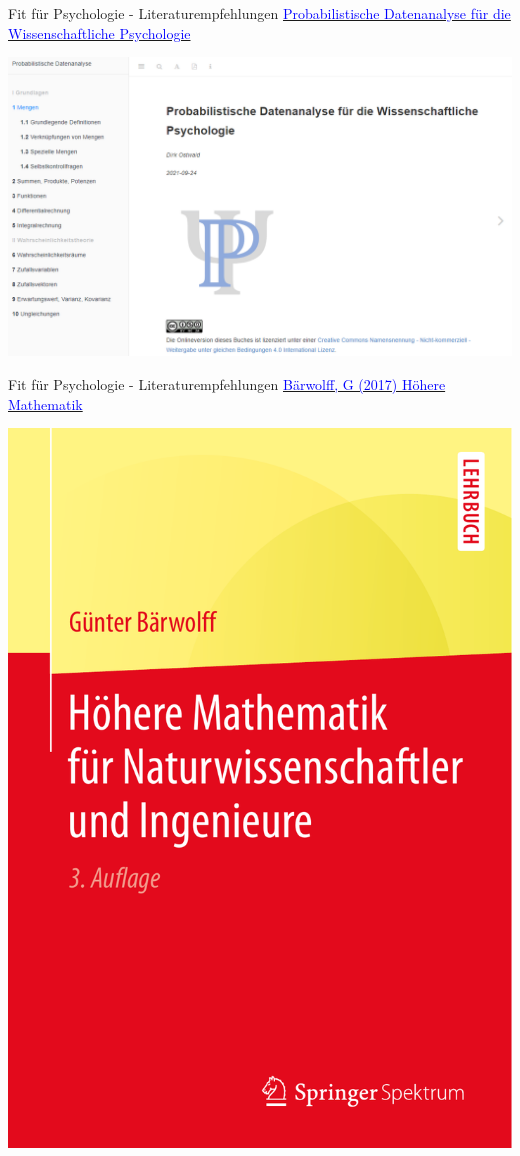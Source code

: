 \documentclass[
  8pt,
  ignorenonframetext,
  t]{beamer}
\begin{document}
\begin{frame}{Fit für Psychologie - Literaturempfehlungen}
\protect\hypertarget{fit-fuxfcr-psychologie---literaturempfehlungen}{}
\href{https://wasd.urz.uni-magdeburg.de/dostwald/}{\textcolor{blue}{Probabilistische Datenanalyse für die Wissenschaftliche Psychologie}}

\vspace{7mm}

\begin{center}\includegraphics[width=0.8\linewidth]{../Abbildungen/glmi_0_pdwp} \end{center}
\end{frame}

\begin{frame}{Fit für Psychologie - Literaturempfehlungen}
\protect\hypertarget{fit-fuxfcr-psychologie---literaturempfehlungen-1}{}
\href{https://www.springer.com/de/book/9783662550212}{\textcolor{blue}{Bärwolff, G (2017) Höhere Mathematik}}

\vspace{5mm}

\begin{center}\includegraphics[width=0.35\linewidth]{../Abbildungen/glmi_0_baerwolff} \end{center}
\end{frame}
\end{document}
